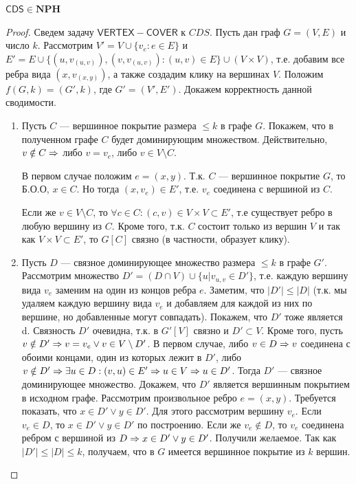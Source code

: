 \begin{corollary}
    \(\mathsf{CDS} \in \mathbf{NPH}\)
\end{corollary}
\begin{proof}
    Сведем задачу \(\mathsf{VERTEX-COVER}\) к \(CDS\). Пусть дан граф \(G = (V, E)\) и число \(k\). Рассмотрим \(V' = V \cup \{v_e: e \in E\}\) и \(E' = E \cup \{(u, v_{(u, v)}), (v, v_{(u, v)}): (u, v) \in E\} \cup (V \times V)\), т.е. добавим все ребра вида \((x, v_(x, y))\), а также создадим клику на вершинах \(V\). Положим \(f(G, k) = (G', k)\), где \(G' = (V', E')\). Докажем корректность данной сводимости.

    \begin{enumerate}
        \item[\(\Ra\)] Пусть \(C\) --- вершинное покрытие размера \(\le k\) в графе \(G\). Покажем, что в полученном графе \(C\) будет доминирующим множеством. Действительно, \(v \notin C \Rightarrow\) либо \(v = v_e\), либо \(v \in V \setminus C\).
        
        В первом случае положим \(e = (x, y)\). Т.к. \(C\) --- вершинное покрытие \(G\), то Б.О.О, \(x \in C\). Но тогда \((x, v_e) \in E'\), т.е. \(v_e\) соединена с вершиной из \(C\). 

        Если же \(v \in V \setminus C\), то \(\forall c \in C: (c, v) \in V \times V \subset E'\), т.е существует ребро в любую вершину из \(C\). Кроме того, т.к. \(C\) состоит только из вершин \(V\) и так как \(V \times V \subset E'\), то \(G[C]\) связно (в частности, образует клику).

        \item [\(\La\)] Пусть \(D\) --- связное доминирующее множество размера \(\le k\) в графе \(G'\). Рассмотрим множество \(D' = (D \cap V) \cup \{u \vert v_{u, v} \in D'\}\), т.е. каждую вершину вида \(v_e\) заменим на один из концов ребра \(e\). Заметим, что \(|D'| \le |D|\) (т.к. мы удаляем каждую вершину вида \(v_e\) и добавляем для каждой из них по вершине, но добавленные могут совпадать). Покажем, что \(D'\) тоже является d. Связность \(D'\) очевидна, т.к. в \(G'[V]\) связно и \(D' \subset V\). Кроме того, пусть \(v \notin D' \Rightarrow v = v_e \vee v \in V \setminus D'\). В первом случае, либо \(v \in D \Rightarrow v\) соединена с обоими концами, один из которых лежит в \(D'\), либо \(v \notin D' \Rightarrow \exists u \in D: (v, u) \in E' \Rightarrow u \in V \Rightarrow u \in D'\). Тогда \(D'\) --- связное доминирующее множество. Докажем, что \(D'\) является вершинным покрытием в исходном графе. Рассмотрим произвольное ребро \(e = (x, y)\). Требуется показать, что \(x \in D' \vee y \in D'\). Для этого рассмотрим вершину \(v_e\). Если \(v_e \in D\), то \(x \in D' \vee y \in D'\) по построению. Если же \(v_e \notin D\), то \(v_e\) соединена ребром с вершиной из \(D \Rightarrow x \in D' \vee y \in D'\). Получили желаемое. Так как \(|D'| \le |D| \le k\), получаем, что в \(G\) имеется вершинное покрытие из \(k\) вершин.
    \end{enumerate}
\end{proof}

